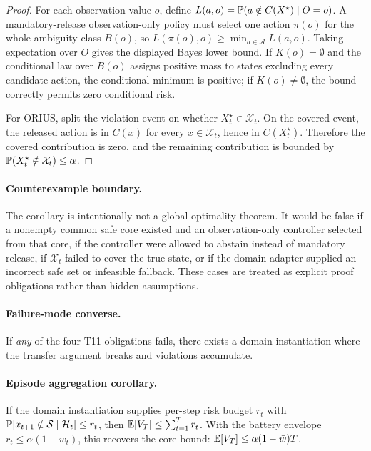 \begin{proof}
For each observation value $o$, define
$L(a,o)=\operatorname{\mathbb{P}}(a\notin C(X^\star)\mid O=o)$.  A mandatory-release
observation-only policy must select one action $\pi(o)$ for the whole
ambiguity class $B(o)$, so
$L(\pi(o),o)\ge \min_{a\in\mathcal{A}}L(a,o)$.  Taking expectation over
$O$ gives the displayed Bayes lower bound.  If $K(o)=\emptyset$ and the
conditional law over $B(o)$ assigns positive mass to states excluding every
candidate action, the conditional minimum is positive; if $K(o)\ne\emptyset$,
the bound correctly permits zero conditional risk.

For ORIUS, split the violation event on whether
$X_t^\star\in\mathcal{X}_t$.  On the covered event, the released action is in
$C(x)$ for every $x\in\mathcal{X}_t$, hence in $C(X_t^\star)$.  Therefore the
covered contribution is zero, and the remaining contribution is bounded by
$\operatorname{\mathbb{P}}(X_t^\star\notin\mathcal{X}_t)\le\alpha$.
\end{proof}

\paragraph{Counterexample boundary.}
The corollary is intentionally not a global optimality theorem.  It would be
false if a nonempty common safe core existed and an observation-only controller
selected from that core, if the controller were allowed to abstain instead of
mandatory release, if $\mathcal{X}_t$ failed to cover the true state, or if the
domain adapter supplied an incorrect safe set or infeasible fallback.  These
cases are treated as explicit proof obligations rather than hidden assumptions.

\paragraph{Failure-mode converse.}
If \emph{any} of the four T11 obligations fails, there exists a domain
instantiation where the transfer argument breaks and violations accumulate.

\paragraph{Episode aggregation corollary.}
If the domain instantiation supplies per-step risk budget $r_t$ with
$\operatorname{\mathbb{P}}[x_{t+1} \notin \mathcal{S} \mid \mathcal{H}_t] \le r_t$, then
$\mathbb{E}[V_T] \le \sum_{t=1}^{T} r_t$.  With the battery envelope
$r_t \le \alpha(1 - w_t)$, this recovers the core bound: $\mathbb{E}[V_T] \le \alpha(1 - \bar{w})T$.

